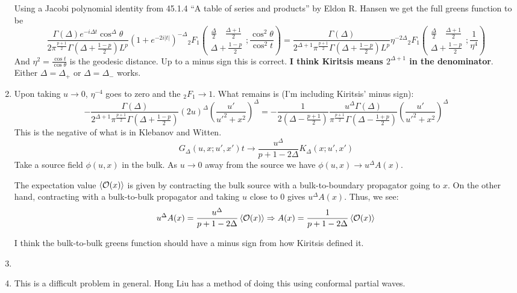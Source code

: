 \documentclass[11pt, class=article, crop=false]{standalone}
\begin{document}
\begin{enumerate}
\[	\]
	Using a Jacobi polynomial identity from 45.1.4 ``A table of series and products'' by Eldon R. Hansen we get the full greens function to be 
	\[
		\frac{\Gamma(\Delta) e^{-i \Delta t} \cos^\Delta \theta}{2 \pi^{\frac{p+1}{2}} \Gamma(\Delta + \frac{1-p}{2}) L^p} (1 + e^{-2 i |t|})^{-\Delta} {_2F_1}\left(\begin{matrix}
			\frac{\Delta}{2} \quad \frac{\Delta + 1}{2}\\ \Delta + \frac{1-p}{2}
		\end{matrix}; \frac{\cos^2 \theta}{\cos^2 t}\right) = \frac{\Gamma(\Delta)}{2^{\Delta + 1} \pi^{\frac{p+1}{2}} \Gamma(\Delta + \frac{1-p}{2}) L^p } \eta^{-2 \Delta} {_2F_1}\left(\begin{matrix}
			\frac{\Delta}{2} \quad \frac{\Delta + 1}{2}\\ \Delta + \frac{1-p}{2}
		\end{matrix}; \frac{1}{\eta^4}\right) 
	\]
	And $\eta^2 = \frac{\cos t}{\cos \theta}$ is the geodesic distance. Up to a minus sign this is correct. \textbf{I think Kiritsis means $2^{\Delta+1}$ in the denominator}. Either $\Delta = \Delta_+$ or $\Delta=\Delta_-$ works. 
	
	
	\item Upon taking $u \to 0$, $\eta^{-4}$ goes to zero and the ${_2F_1} \to 1$. What remains is (I'm including Kiritsis' minus sign):
	\[
		-\frac{\Gamma(\Delta)}{2^{\Delta+1} \pi^{\frac{p+1}{2}} \Gamma(\Delta + \frac{1-p}{2})} (2u)^{\Delta} \left(\frac{u'}{{u'}^2 + x^2} \right)^\Delta = -\frac{1}{2 (\Delta - \frac{p + 1}{2})} \frac{u^\Delta \Gamma(\Delta)}{ \pi^{\frac{p+1}{2}} \Gamma(\Delta - \frac{1+p}{2})} \left(\frac{u'}{{u'}^2 + x^2} \right)^\Delta 
	\]
	This is the negative of what is in Klebanov and Witten. 
	\[
		G_{\Delta}(u, x; u', x') t\to \frac{u^\Delta}{p+1 - 2 \Delta} K_\Delta(x; u', x')
	\]
	Take a source field $\phi(u,x)$ in the bulk. As $u \to 0$ away from the source we have $\phi(u, x) \to u^{\Delta} A(x)$.
	
	The expectation value $\braket{\mathcal{O}(x)}$ is given by contracting the bulk source with a bulk-to-boundary propagator going to $x$. On the other hand, contracting with a bulk-to-bulk propagator and taking $u$ close to $0$ gives $u^{\Delta} A(x)$. Thus, we see:
	\[
		u^{\Delta} A(x) = \frac{u^{\Delta}}{p+1-2\Delta} \braket{\mathcal{O}(x)} \Rightarrow A(x) = \frac{1}{p+1-2 \Delta} \braket{\mathcal{O}(x)}
	\]
	
	I think the bulk-to-bulk greens function should have a minus sign from how Kiritsis defined it.
	
	\item 
	
	\item This is a difficult problem in general. Hong Liu has a method of doing this using conformal partial waves. 
	
\end{enumerate}

\end{document}
